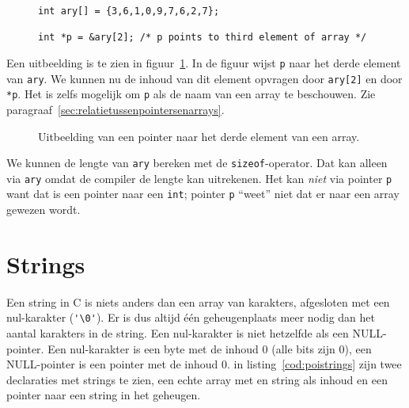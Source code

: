 \begin{figure}[!ht]
\begin{lstlisting}[caption=Een pointer naar het derde element van een array.,label=cod:poithirdarray]
int ary[] = {3,6,1,0,9,7,6,2,7};

int *p = &ary[2]; /* p points to third element of array */
\end{lstlisting}
\end{figure}

Een uitbeelding is te zien in figuur~\ref{fig:poithirdarray}. In de figuur wijst \texttt{p} naar het derde element van \texttt{ary}. We kunnen nu de inhoud van dit element opvragen door \texttt{ary[2]} en door \texttt{*p}. Het is zelfs mogelijk om \texttt{p} als de naam van een array te beschouwen. Zie paragraaf~\ref{sec:relatietussenpointersenarrays}.

\begin{figure}[!ht]
\centering
{}
\caption{Uitbeelding van een pointer naar het derde element van een array.}
\label{fig:poithirdarray}
\end{figure}

We kunnen de lengte van \texttt{ary} bereken met de \texttt{sizeof}-operator. Dat kan alleen via \texttt{ary} omdat de compiler de lengte kan uitrekenen. Het kan \textsl{niet} via pointer \texttt{p} want dat is een pointer naar een \texttt{int}; pointer \texttt{p} ``weet'' niet dat er naar een array gewezen wordt.

\section{Strings}
\label{sec:strings}
Een string in C is niets anders dan een array van karakters, afgesloten met een nul-karakter (\lstinline|'\0'|). Er is dus altijd één geheugenplaats meer nodig dan het aantal karakters in de string. Een nul-karakter is niet hetzelfde als een NULL-pointer. Een nul-karakter is een byte met de inhoud 0 (alle bits zijn 0), een NULL-pointer is een pointer met de inhoud 0. in listing~\ref{cod:poistrings} zijn twee declaraties met strings te zien, een echte array met en string als inhoud en een pointer naar een string in het geheugen.

